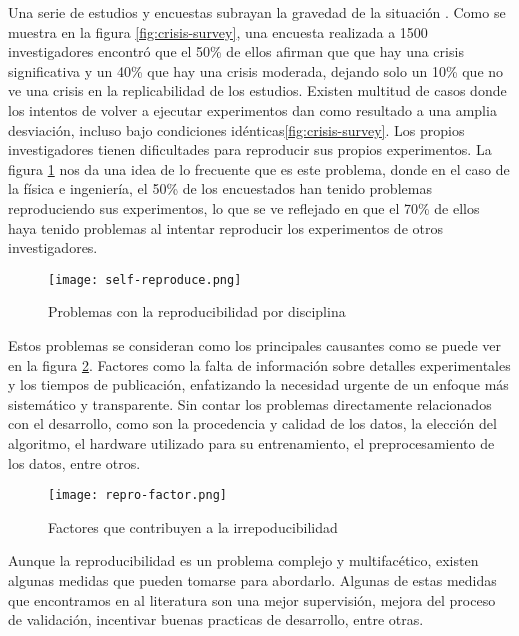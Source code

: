 Una serie de estudios y encuestas subrayan la gravedad de la situación \cite{Baker_2016}.
Como se muestra en la figura \ref{fig:crisis-survey}, una encuesta realizada a 1500 investigadores
encontró que el 50\% de ellos afirman que que hay una crisis significativa y un 40\% que hay
una crisis moderada, dejando solo un 10\% que no ve una crisis en la replicabilidad de los estudios.
Existen multitud de casos donde los intentos de volver a ejecutar experimentos dan como resultado 
a una amplia desviación, incluso bajo condiciones idénticas\ref{fig:crisis-survey}.
Los propios investigadores tienen dificultades para reproducir sus propios experimentos.
La figura \ref{fig:self-reproduce} nos da una idea de lo frecuente que es este problema,
donde en el caso de la física e ingeniería, el 50\% de los encuestados han tenido problemas
reproduciendo sus experimentos, lo que se ve reflejado en que el 70\% de ellos haya tenido
problemas al intentar reproducir los experimentos de otros investigadores.

\begin{figure}[ht]
    \centering
    \texttt{[image: self-reproduce.png]}
    \caption{Problemas con la reproducibilidad por disciplina \cite{Baker_2016}}\label{fig:self-reproduce}
\end{figure}

Estos problemas se consideran como los principales causantes como se puede ver en la figura \ref{fig:repro-factor}.
Factores como la falta de información sobre detalles experimentales y los tiempos de pu\-bli\-cación, enfatizando 
la necesidad urgente de un enfoque más sistemático y transparente. Sin contar los problemas
directamente relacionados con el desarrollo, como son la procedencia y calidad de los datos, la 
elección del algoritmo, el hardware utilizado para su entrenamiento, el preprocesamiento de 
los datos, entre otros.

\begin{figure}[ht]
    \centering
    \texttt{[image: repro-factor.png]}
    \caption{Factores que contribuyen a la irrepoducibilidad \cite{Baker_2016}}\label{fig:repro-factor}
\end{figure}

Aunque la reproducibilidad es un problema complejo y multifacético, existen
algunas medidas que pueden tomarse para abordarlo. Algunas de estas medidas que encontramos
en al literatura son una mejor supervisión, mejora del proceso de validación, incentivar
buenas practicas de desarrollo, entre otras. 

